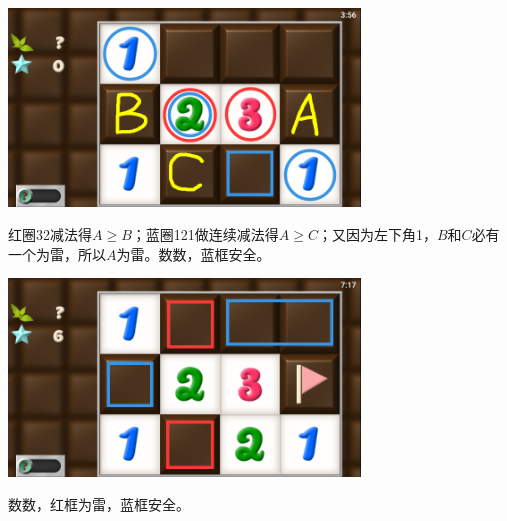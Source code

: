 \subsection{} %
\begin{center}
    \includegraphics[width=0.7\textwidth]{puzzle/40-1.png}
\end{center}
红圈32减法得$A\ge B$；蓝圈121做连续减法得$A\ge C$；又因为左下角1，$B$和$C$必有一个为雷，所以$A$为雷。数数，蓝框安全。
\begin{center}
    \includegraphics[width=0.7\textwidth]{puzzle/40-2.png}
\end{center}
数数，红框为雷，蓝框安全。

